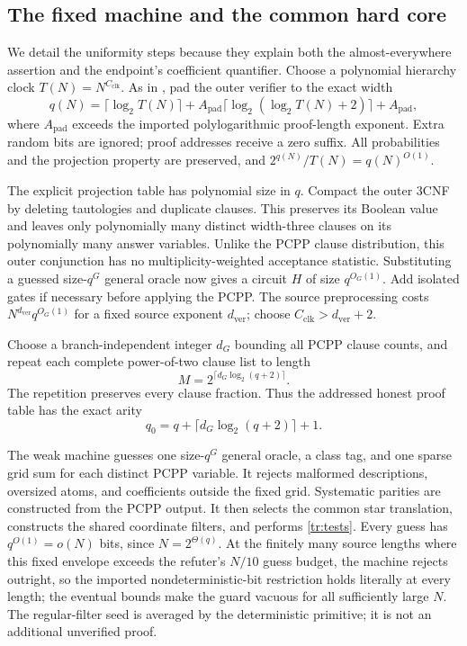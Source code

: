 \documentclass[11pt,letterpaper]{article}
\theoremstyle{definition}
\theoremstyle{remark}
\begin{document}
\subsection{The fixed machine and the common hard core}
\label{tr:machine}

We detail the uniformity steps because they explain both the
almost-everywhere assertion and the endpoint's coefficient quantifier.
Choose a polynomial hierarchy clock $T(N)=N^{C_{\mathrm{clk}}}$.
As in \cite[Lemmas~C.5--C.6]{NagCubic}, pad the outer verifier to
the exact width
\begin{equation}
 q(N)=\lceil\log_2 T(N)\rceil+
 A_{\mathrm{pad}}\lceil\log_2(\log_2T(N)+2)\rceil+A_{\mathrm{pad}},
 \label{tr:native-width}
\end{equation}
where $A_{\mathrm{pad}}$ exceeds the imported polylogarithmic
proof-length exponent. Extra random bits are ignored; proof addresses
receive a zero suffix. All probabilities and the projection property
are preserved, and $2^{q(N)}/T(N)=q(N)^{O(1)}$.

The explicit projection table has polynomial size in $q$. Compact the
outer 3CNF by deleting tautologies and duplicate clauses. This preserves
its Boolean value and leaves only polynomially many distinct width-three
clauses on its polynomially many answer variables. Unlike the PCPP
clause distribution, this outer conjunction has no multiplicity-weighted
acceptance statistic. Substituting a guessed size-$q^G$ general oracle
now gives a circuit $H$ of size $q^{O_G(1)}$. Add isolated gates if
necessary before applying the PCPP. The source preprocessing costs
$N^{d_{\mathrm{ver}}}q^{O_G(1)}$ for a fixed source exponent
$d_{\mathrm{ver}}$; choose $C_{\mathrm{clk}}>d_{\mathrm{ver}}+2$.

Choose a branch-independent integer $d_G$ bounding all PCPP clause
counts, and repeat each complete power-of-two clause list to length
\[
 M=2^{\lceil d_G\log_2(q+2)\rceil}.
\]
The repetition preserves every clause fraction. Thus the addressed
honest proof table has the exact arity
\begin{equation}
 q_0=q+\lceil d_G\log_2(q+2)\rceil+1.
 \label{tr:address-width}
\end{equation}

The weak machine guesses one size-$q^G$ general oracle, a class tag,
and one sparse grid sum for each distinct PCPP variable. It rejects
malformed descriptions, oversized atoms, and coefficients outside the
fixed grid. Systematic parities are constructed from the PCPP output.
It then selects the common star translation, constructs the shared
coordinate filters, and performs \eqref{tr:tests}.
Every guess has $q^{O(1)}=o(N)$ bits, since $N=2^{\Theta(q)}$. At the
finitely many source lengths where this fixed envelope exceeds the
refuter's $N/10$ guess budget, the machine rejects outright, so the
imported nondeterministic-bit restriction holds literally at every
length; the eventual bounds make the guard vacuous for all
sufficiently large $N$.
The regular-filter seed is averaged by the deterministic primitive;
it is not an additional unverified proof.
\end{document}
